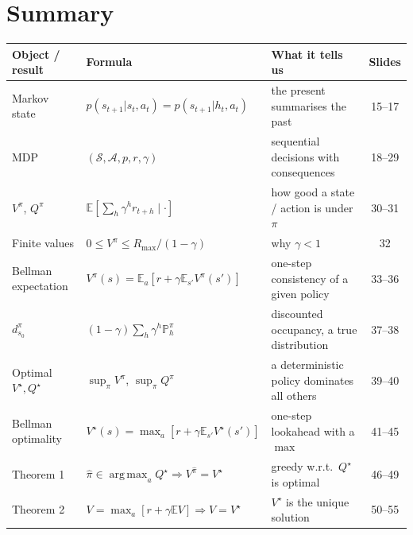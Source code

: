 \documentclass[11pt,a4paper]{article}
\newcommand{\E}{\mathbb{E}}
\newcommand{\PP}{\mathbb{P}}
\DeclareMathOperator*{\argmax}{arg\,max}
\newcommand{\cS}{\mathcal{S}}
\newcommand{\cA}{\mathcal{A}}
\newcommand{\Rmax}{R_{\max}}
\theoremstyle{plain}
\theoremstyle{definition}
\theoremstyle{remark}
\begin{document}
\section{Summary}
\begin{center}
\small
\renewcommand{\arraystretch}{1.35}
\begin{tabular}{@{}>{\raggedright\arraybackslash}p{2.9cm}>{\raggedright\arraybackslash}p{6.3cm}>{\raggedright\arraybackslash}p{4.5cm}c@{}}
\toprule
\textbf{Object / result} & \textbf{Formula} & \textbf{What it tells us} & \textbf{Slides}\\
\midrule
Markov state & $p(s_{t+1}|s_t,a_t)=p(s_{t+1}|h_t,a_t)$ & the present summarises the past & 15--17\\
MDP & $(\cS,\cA,p,r,\gamma)$ & sequential decisions with consequences & 18--29\\
$V^\pi$, $Q^\pi$ & $\E[\sum_h\gamma^hr_{t+h}\mid\cdot]$ & how good a state / action is under $\pi$ & 30--31\\
Finite values & $0\le V^\pi\le\Rmax/(1-\gamma)$ & why $\gamma<1$ & 32\\
Bellman expectation & $V^\pi(s)=\E_a[r+\gamma\E_{s'}V^\pi(s')]$ & one-step consistency of a given policy & 33--36\\
$d^\pi_{s_0}$ & $(1-\gamma)\sum_h\gamma^h\PP^\pi_h$ & discounted occupancy, a true distribution & 37--38\\
Optimal $V^\star,Q^\star$ & $\sup_\pi V^\pi$, $\sup_\pi Q^\pi$ & a deterministic policy dominates all others & 39--40\\
Bellman optimality & $V^\star(s)=\max_a[r+\gamma\E_{s'}V^\star(s')]$ & one-step lookahead with a $\max$ & 41--45\\
Theorem 1 & $\hat\pi\in\argmax_aQ^\star\Rightarrow V^{\hat\pi}=V^\star$ & greedy w.r.t.\ $Q^\star$ is optimal & 46--49\\
Theorem 2 & $V=\max_a[r+\gamma\E V]\Rightarrow V=V^\star$ & $V^\star$ is the unique solution & 50--55\\
\bottomrule
\end{tabular}
\end{center}
\end{document}
